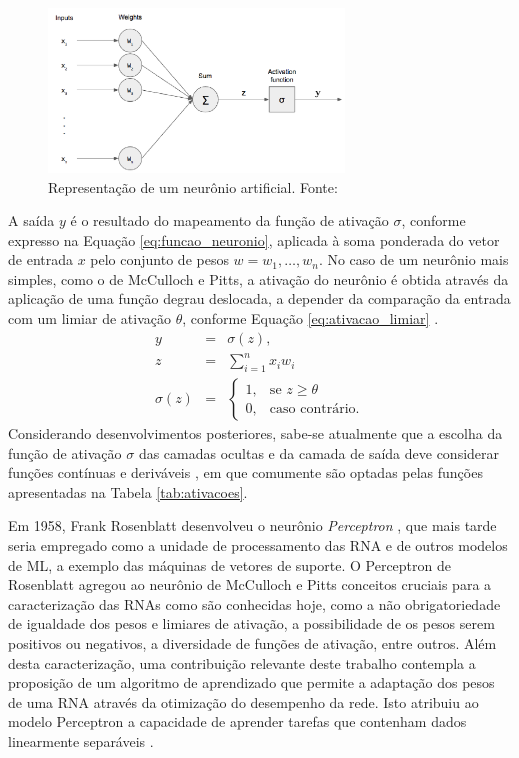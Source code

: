 \begin{figure}[!ht]
	\centering
	\caption{Representação de um neurônio artificial. Fonte: \cite{neuronio:perceptron}}
	\label{fig:neuronio}
	\includegraphics[width=0.7\textwidth]{img/perceptron.png}
\end{figure}
A saída $y$ é o resultado do mapeamento da função de ativação $\sigma$, conforme expresso na Equação \ref{eq:funcao_neuronio}, aplicada à soma ponderada do vetor de entrada $x$ pelo conjunto de pesos $w = w_1, \ldots, w_n$. No caso de um neurônio mais simples, como o de McCulloch e Pitts, a ativação do neurônio é obtida através da aplicação de uma função degrau deslocada, a depender da comparação da entrada com um limiar de ativação $\theta$, conforme Equação \ref{eq:ativacao_limiar} \cite{mcculloch1943logical}.
\begin{eqnarray}
	y &=& \sigma\left( z\right),\label{eq:funcao_neuronio}\\
	z &=& \sum_{i=1}^n x_i w_i\\
	\sigma(z) &=& \begin{cases}
		1, & \text{se } z \geq \theta\label{eq:ativacao_limiar}\\
		0, & \text{caso contrário.}
	\end{cases}
\end{eqnarray}
Considerando desenvolvimentos posteriores, sabe-se atualmente que a escolha da função de ativação $\sigma$ das camadas ocultas e da camada de saída deve considerar funções contínuas e deriváveis \cite{hornik1991approximation}, em que comumente são optadas pelas funções apresentadas na Tabela  \ref{tab:ativacoes}.

 

Em 1958, Frank Rosenblatt desenvolveu o neurônio \emph{Perceptron} \cite{rosenblatt1958perceptron}, que mais tarde seria empregado como a unidade de processamento das RNA e de outros modelos de ML, a exemplo das máquinas de vetores de suporte. O Perceptron de Rosenblatt agregou ao neurônio de McCulloch e Pitts conceitos cruciais para a caracterização das RNAs como são conhecidas hoje, como a não obrigatoriedade de igualdade dos pesos e limiares de ativação, a possibilidade de os pesos serem positivos ou negativos, a diversidade de funções de ativação, entre outros. Além desta caracterização, uma contribuição relevante deste trabalho contempla a proposição de um algoritmo de aprendizado que permite a adaptação dos pesos de uma RNA através da otimização do desempenho da rede. Isto atribuiu ao modelo Perceptron a capacidade de aprender tarefas que contenham dados linearmente separáveis \cite{Teresa:Livro}.

